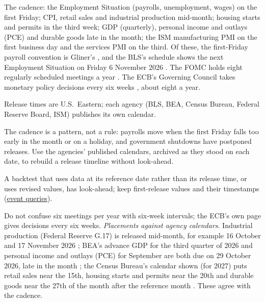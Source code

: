 \begin{qfdata}\label{data:us-macro-release-calendar}
 The cadence: the Employment Situation (payrolls, unemployment, wages) on the first Friday; CPI, retail sales and industrial production mid-month; housing starts and permits in the third week; GDP (quarterly), personal income and outlays (PCE) and durable goods late in the month; the ISM manufacturing PMI on the first business day and the services PMI on the third. Of these, the first-Friday payroll convention is Gliner's \citep[chap.~12, PDF p.~406]{s7-gliner}, and the BLS's schedule shows the next Employment Situation on Friday 6 November 2026 \citep[program page]{bls-ces-page}. The FOMC holds eight regularly scheduled meetings a year \citep[page updated 7 October 2026]{fomc-page}. The ECB's Governing Council takes monetary policy decisions every six weeks \citep[web page]{ecb-governing-council}, about eight a year.

 Release times are U.S.\ Eastern; each agency (BLS, BEA, Census Bureau, Federal Reserve Board, ISM) publishes its own calendar.

 The cadence is a pattern, not a rule: payrolls move when the first Friday falls too early in the month or on a holiday, and government shutdowns have postponed releases. Use the agencies' published calendars, archived as they stood on each date, to rebuild a release timeline without look-ahead.

 A backtest that uses data at its reference date rather than its release time, or uses revised values, has look-ahead; keep first-release values and their timestamps (\hyperref[meth:macro-event-queries]{event queries}).

 Do not confuse six meetings per year with six-week intervals; the ECB's own page gives decisions every six weeks. \emph{Placements against agency calendars}. Industrial production (Federal Reserve G.17) is released mid-month, for example 16 October and 17 November 2026 \citep[release dates]{fed-g17-dates}; BEA's advance GDP for the third quarter of 2026 and personal income and outlays (PCE) for September are both due on 29 October 2026, late in the month \citep[2026 schedule]{bea-schedule}; the Census Bureau's calendar shown (for 2027) puts retail sales near the 15th, housing starts and permits near the 20th and durable goods near the 27th of the month after the reference month \citep[economic indicator calendar]{census-econ-calendar}. These agree with the cadence.


\end{qfdata}
